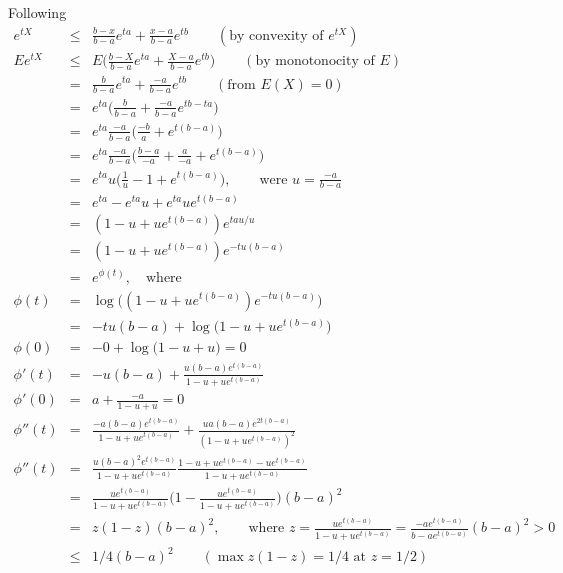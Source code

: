 \begin{prf} Following \cite{Mohri2012}
\begin{eqnarray*}
e^{tX} & \leq & \frac{b-x}{b-a} e^{ta} + \frac{x-a}{b-a} e^{tb} \qquad (\text{by convexity of } e^{tX}) \\
E e^{tX} & \leq & E \Big( \frac{b-X}{b-a} e^{ta} + \frac{X-a}{b-a} e^{tb} \Big) \qquad (\text{by monotonocity of } E) \\
& = & \frac{b}{b-a} e^{ta} + \frac{-a}{b-a} e^{tb} \qquad (\text{from } E(X)=0) \\
& = & e^{ta} \Big( \frac{b}{b-a} + \frac{-a}{b-a}e^{tb-ta} \Big) \\
& = & e^{ta} \frac{-a}{b-a} \Big( \frac{-b}{a} + e^{t(b-a)} \Big) \\
& = & e^{ta} \frac{-a}{b-a} \Big( \frac{b-a}{-a} + \frac{a}{-a} + e^{t(b-a)} \Big) \\
& = & e^{ta} u \Big( \frac{1}{u} - 1 + e^{t(b-a)} \Big), \qquad \text{were } u=\frac{-a}{b-a} \\
& = & e^{ta} - e^{ta} u  + e^{ta} u e^{t(b-a)}  \\
& = & (1 - u  + u e^{t(b-a)}) e^{ta u / u }  \\
& = & (1 - u  + u e^{t(b-a)}) e^{-tu(b-a)}  \\
& = & e^{\phi(t)}, \quad \text{where } \\
\phi(t) & = & \log \Big( (1 - u  + u e^{t(b-a)}) e^{-tu(b-a)} \Big) \\
& = & -tu(b-a) + \log \big( 1 - u  + u e^{t(b-a)} \big) \\
\phi(0) & = & -0 + \log \big( 1 - u  + u \big) = 0\\
\phi'(t) & = & -u(b-a) + \frac{u(b-a)e^{t(b-a)}}{1 - u  + u e^{t(b-a)}} \\
\phi'(0) & = & a + \frac{-a}{1 - u  + u} = 0 \\
\phi''(t) & = & \frac{-a(b-a) e^{t(b-a)}}{1 - u  + u e^{t(b-a)}} + \frac{ua(b-a)e^{2t(b-a)}}{(1 - u  + u e^{t(b-a)})^2} \\
\phi''(t) & = & \frac{u(b-a)^2 e^{t(b-a)}}{1 - u  + u e^{t(b-a)}}\frac{1 - u + u e^{t(b-a)} - u e^{t(b-a)}}{1 - u  + u e^{t(b-a)}} \\
& = & \frac{u e^{t(b-a)}}{1 - u  + u e^{t(b-a)}} \Big( 1 - \frac{u e^{t(b-a)}}{1 - u  + u e^{t(b-a)}} \Big) (b-a)^2 \\
 & = & z(1-z) (b-a)^2, \qquad \text{where } z =  \frac{u e^{t(b-a)}}{1 - u  + u e^{t(b-a)}} = \frac{-a e^{t(b-a)}}{b - a e^{t(b-a)}}(b-a)^2 > 0\\
 & \leq & 1/4 (b-a)^2 \qquad (\max z (1 - z) = 1/4 \text{ at } z=1/2) \\
\end{eqnarray*}
\end{prf}

